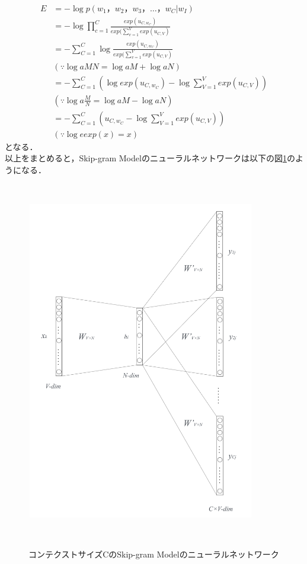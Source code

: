 \begin{align}
E &= - \log p(w_{1}，w_{2}，w_{3}， \ldots ，w_{C}|w_{I}) \nonumber \\
  &= - \log \prod_{c=1}^{C} \frac{exp(u_{C,w_{C}})}{exp(\sum_{v=1}^{V} exp(u_{C,V})} \nonumber \\
  &= - \sum_{C=1}^{C} \log \frac{exp(u_{C,w_{C}})}{exp(\sum_{v=1}^{V} exp(u_{C,V})} \nonumber \\
  &(\because \log{a} MN = \log{a} M + \log{a} N) \nonumber \\
  &= - \sum_{C=1}^{C}(\log exp(u_{C,w_{C}}) - \log \sum_{V=1}^{V} exp(u_{C,V})) \nonumber \\
  &(\because \log{a} \frac{M}{N} = \log{a} M - \log{a} N) \nonumber \\
  &= - \sum_{C=1}^{C}(u_{C,w_{C}} - \log \sum_{V=1}^{V} exp(u_{C,V})) \nonumber \\
  &(\because \log{e} exp(x) = x) \label{eq:lastmokuteki}
\end{align}
となる．
\\
以上をまとめると，Skip-gram Modelのニューラルネットワークは以下の図\ref{fig:neuralnet}のようになる．
\begin{figure}[htbp]
　\begin{center}
   \includegraphics[width=100mm,height=140mm]{figures/skip-gram.pdf}
   \caption{コンテクストサイズCのSkip-gram Modelのニューラルネットワーク}
   \label{fig:neuralnet}
　\end{center}
\end{figure}

